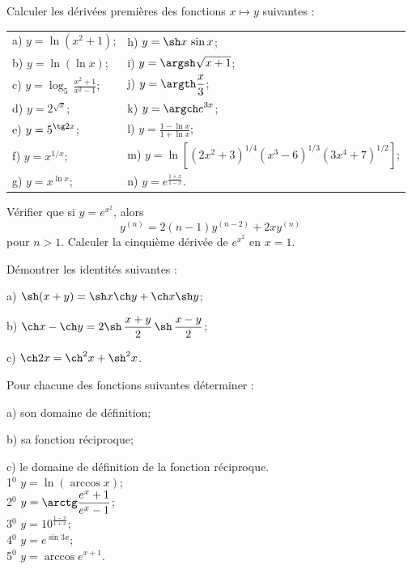\documentclass[12pt,french,oneside,a4paper]{memoir} %
\begin{document}
\begin{exo}
Calculer les dérivées premières des fonctions $x\mapsto
  y$ suivantes :\\
  
  \begin{tabular}{ll}
  a) $\displaystyle{y=\ln (x^2+1)}$;\qquad\qquad&
  h) $\displaystyle{y=\sh x\,\sin x}$;\\[3mm]
  b) $\displaystyle{y=\ln (\ln x)}$;\qquad\qquad&
  i) $\displaystyle{y=\argsh \sqrt{x+1}}$;\\[3mm]
  c) $\displaystyle{y=\log_5\,\frac{x^2+1}{x^2-1}}$;\qquad\qquad&
  j) $\displaystyle{y=\argth \frac{x}{3}}$;\\[3mm]
  d) $\displaystyle{y=2^{\sqrt x}}$;\qquad\qquad&
  k) $\displaystyle{y=\argch e^{3x}}$;\\[3mm]
  e) $\displaystyle{y=5^{\tg 2x}}$;\qquad\qquad& 
  l) $\displaystyle{y=\frac{1-\ln x}{1+\ln x}}$;\\[3mm]
  f) $\displaystyle{y=x^{1/x}}$;\qquad\qquad& 
  m)
  $\displaystyle{y=\ln [(2x^2+3)^{1/4}(x^3-6)^{1/3}
  (3x^4+7)^{1/2}]}$;\\[3mm]
  g) $\displaystyle{y=x^{\ln x}}$;\qquad\qquad& 
  n) $\displaystyle{y=e^{\frac{1+x}{1-x}}}$.
  \end{tabular}
\end{exo}
\begin{exo}
Vérifier que si $\displaystyle{y=e^{x^2}}$, alors
  \begin{equation*}
  y^{(n)}=2(n-1)y^{(n-2)}+2xy^{(n)}
\end{equation*}
  pour $n>1$. Calculer la cinquième dérivée de
  $\displaystyle{e^{x^2}}$ en $x=1$.
\end{exo}
\begin{exo}
Démontrer les identités suivantes :
  
  a) $\sh(x+y)=\sh x\ch y +
  \ch x\sh y$;
  
  b) $\displaystyle{\ch x-\ch
  y=2\sh\,\frac{x+y}{2}\,\sh\,\frac{x-y}{2}}$;
  
  c) $\ch 2x=\ch^2x+\sh^2x$.
\end{exo}
\begin{exo}
Pour chacune des fonctions suivantes déterminer :
  
  a) son domaine de définition;
  
  b) sa fonction réciproque;
  
  c) le domaine de définition de la fonction réciproque.\\
  \hspace*{10mm} 1$^0$ $y=\ln (\arccos x)$;\\[3mm]
  \hspace*{10mm} 2$^0$ $\displaystyle{y=\arctg
  \frac{e^x+1}{e^x-1}}$;\\[3mm]
  \hspace*{10mm} 3$^0$ $\displaystyle{y=10^{\frac{1-x}{1+x}}}$;\\[3mm]
  \hspace*{10mm} 4$^0$ $\displaystyle{y=e^{\sin 3x}}$;\\[3mm]
  \hspace*{10mm} 5$^0$ $\displaystyle{y=\arccos e^{x+1}}$.
\end{exo}
\end{document}
